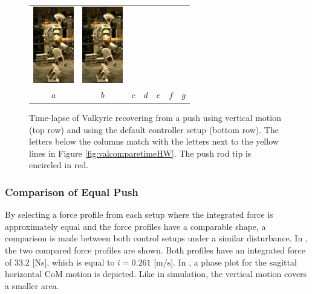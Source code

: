 \begin{figure}
\begin{tabular}{ccccccc}
    \includegraphics[width=0.7in]{STYLESTUFF/val6d_30} &
    \includegraphics[width=0.7in]{STYLESTUFF/val7d_30} \\
    $a$&
    $b$&
    $c$&
    $d$&
    $e$&
    $f$&
    $g$\\
  \end{tabular}
  \caption{Time-lapse of Valkyrie recovering from a push using vertical motion (top row) and using the default controller setup (bottom row). The letters below the columns match with the letters next to the yellow lines in Figure \ref{fig:valcomparetimeHW}. The push rod tip is encircled in red.}
  \label{fig:val}
\end{figure}

\subsubsection{Comparison of Equal Push} 
By selecting a force profile from each setup where the integrated force is approximately equal and the force profiles have a comparable shape, a comparison is made between both control setups under a similar disturbance. In , the two compared force profiles are shown. Both profiles have an integrated force of $33.2$ [Ns], which is equal to $i=0.261$ [m/s]. In , a phase plot for the sagittal horizontal \ac{CoM} motion is depicted. Like in simulation, the vertical motion covers a smaller area. 

